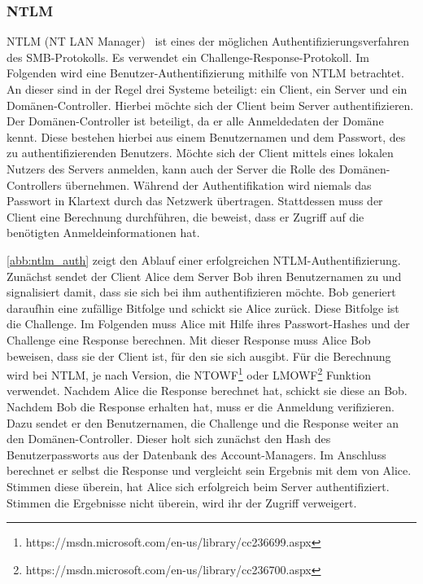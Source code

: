 \documentclass{AIFB_ITI_Crypto_Seminar}
\begin{document}
\subsubsection{NTLM}
\label{auth}
NTLM (NT LAN Manager)~\cite{ntlm} ist eines der möglichen Authentifizierungsverfahren des SMB-Protokolls. Es verwendet ein Challenge-Response-Protokoll. Im Folgenden wird eine Benutzer-Authentifizierung mithilfe von NTLM betrachtet. An dieser sind in der Regel drei Systeme beteiligt: ein Client, ein Server und ein Domänen-Controller. Hierbei möchte sich der Client beim Server authentifizieren. Der Domänen-Controller ist beteiligt, da er alle Anmeldedaten der Domäne kennt. Diese bestehen hierbei aus einem Benutzernamen und dem Passwort, des zu authentifizierenden Benutzers. Möchte sich der Client mittels eines lokalen Nutzers des Servers anmelden, kann auch der Server die Rolle des Domänen-Controllers übernehmen. Während der Authentifikation wird niemals das Passwort in Klartext durch das Netzwerk übertragen. Stattdessen muss der Client eine Berechnung durchführen, die beweist, dass er Zugriff auf die benötigten Anmeldeinformationen hat. \par 
\autoref{abb:ntlm_auth} zeigt den Ablauf einer erfolgreichen NTLM-Authentifizierung. Zunächst sendet der Client Alice dem Server Bob ihren Benutzernamen zu und signalisiert damit, dass sie sich bei ihm authentifizieren möchte. Bob generiert daraufhin eine zufällige Bitfolge und schickt sie Alice zurück. Diese Bitfolge ist die Challenge. Im Folgenden muss Alice mit Hilfe ihres Passwort-Hashes und der Challenge eine Response berechnen. Mit dieser Response muss Alice Bob beweisen, dass sie der Client ist, für den sie sich ausgibt. Für die Berechnung wird bei NTLM, je nach Version, die NTOWF\footnote{https://msdn.microsoft.com/en-us/library/cc236699.aspx} oder LMOWF\footnote{https://msdn.microsoft.com/en-us/library/cc236700.aspx} Funktion verwendet. Nachdem Alice die Response berechnet hat, schickt sie diese an Bob. 
Nachdem Bob die Response erhalten hat, muss er die Anmeldung verifizieren. Dazu sendet er den Benutzernamen, die Challenge und die Response weiter an den Domänen-Controller. Dieser holt sich zunächst den Hash des Benutzerpassworts aus der Datenbank des Account-Managers. Im Anschluss berechnet er selbst die Response und vergleicht sein Ergebnis mit dem von Alice. Stimmen diese überein, hat Alice sich erfolgreich beim Server authentifiziert. Stimmen die Ergebnisse nicht überein, wird ihr der Zugriff verweigert.
\end{document}
